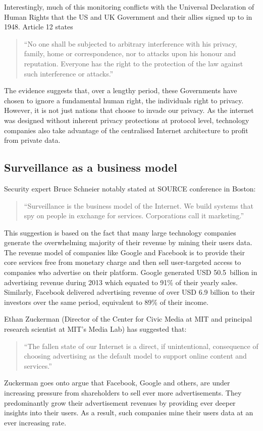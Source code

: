 \documentclass[twocolumn,english]{article}
\begin{document}
Interestingly, much of this monitoring conflicts with the Universal
Declaration of Human Rights that the US and UK Government and their
allies signed up to in 1948. Article 12 states\cite{unhrd12}
\begin{quote}
\textquotedblleft No one shall be subjected to arbitrary interference
with his privacy, family, home or correspondence, nor to attacks upon
his honour and reputation. Everyone has the right to the protection
of the law against such interference or attacks.\textquotedblright
\end{quote}
The evidence suggests that, over a lengthy period, these Governments
have chosen to ignore a fundamental human right, the individuals right
to privacy. However, it is not just nations that choose to invade
our privacy.  As the internet was designed without inherent privacy protections at protocol level, technology companies also take advantage of the centralised Internet architecture to profit from private data.

\subsection{Surveillance as a business model }

Security expert Bruce Schneier notably stated at SOURCE conference in Boston:\cite{boston14}
\begin{quote}
\textquotedblleft Surveillance is the business model of the Internet. We build systems that spy on people in exchange for services. Corporations call it marketing.\textquotedblright
\end{quote}
This suggestion is based on the fact that many large technology
companies generate the overwhelming majority of their revenue by
mining their users data. The revenue model of companies like Google
and Facebook is to provide their core services free from monetary
charge and then sell user-targeted access to companies who advertise on their platform. Google generated USD 50.5~billion in advertising
revenue during 2013 which equated to 91\% of their yearly sales\cite{google13}. Similarly, Facebook delivered advertising revenue of over USD 6.9
billion to their investors over the same period, equivalent to 89\%
of their income\cite{facebook13}. 

Ethan Zuckerman (Director of the Center for Civic Media at MIT and
principal research scientist at MIT\textquoteright s Media Lab) has
suggested that\cite{zuckerman14}:
\begin{quote}
\textquotedblleft The fallen state of our Internet is a direct, if
unintentional, consequence of choosing advertising as the default
model to support online content and services.\textquotedblright 
\end{quote}
Zuckerman goes onto argue that Facebook, Google and others, are under
increasing pressure from shareholders to sell ever more advertisements.
They predominantly grow their advertisement revenues by providing ever deeper insights into their users.  As a result, such companies mine their users data at an ever increasing rate.
\end{document}
